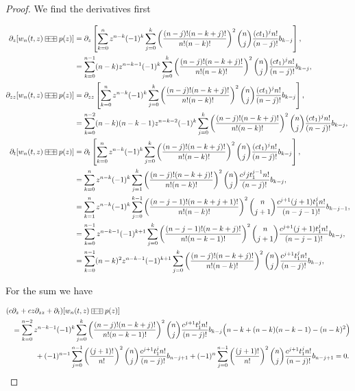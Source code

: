 \begin{proof}
    We find the derivatives first

    \begin{align*}
        \partial_z[w_n(t,z) \aac p(z)] &= \partial_z \left[ \sum_{k=0}^n z^{n-k}(-1)^k \sum_{j=0}^k \left(\frac{(n-j)!(n-k+j)!}{n!(n-k)!}\right)^2 \binom{n}{j}\frac{(ct_1)^jn!}{(n-j)!}b_{k-j}\right],\\ 
        &= \sum_{k=0}^{n-1} (n-k)z^{n-k-1}(-1)^k \sum_{j=0}^k \left(\frac{(n-j)!(n-k+j)!}{n!(n-k)!}\right)^2 \binom{n}{j}\frac{(ct_1)^jn!}{(n-j)!}b_{k-j},\\
        \partial_{zz}[w_n(t,z) \aac p(z)] &= \partial_{zz} \left[ \sum_{k=0}^n z^{n-k}(-1)^k \sum_{j=0}^k \left(\frac{(n-j)!(n-k+j)!}{n!(n-k)!}\right)^2 \binom{n}{j}\frac{(ct_1)^jn!}{(n-j)!}b_{k-j}\right],\\ 
        &= \sum_{k=0}^{n-2} (n-k)(n-k-1)z^{n-k-2}(-1)^k \sum_{j=0}^k \left(\frac{(n-j)!(n-k+j)!}{n!(n-k)!}\right)^2 \binom{n}{j}\frac{(ct_1)^jn!}{(n-j)!}b_{k-j},\\
        \partial_t[w_n(t,z) \aac p(z)] &= \partial_t \left[ \sum_{k=0}^n z^{n-k}(-1)^k \sum_{j=0}^k \left(\frac{(n-j)!(n-k+j)!}{n!(n-k)!}\right)^2 \binom{n}{j}\frac{(ct_1)^jn!}{(n-j)!}b_{k-j}\right],\\
        &= \sum_{k=0}^n z^{n-k}(-1)^k \sum_{j=1}^k \left(\frac{(n-j)!(n-k+j)!}{n!(n-k)!}\right)^2 \binom{n}{j}\frac{c^j jt_1^{j-1}n!}{(n-j)!}b_{k-j},\\ 
        &= \sum_{k=1}^n z^{n-k}(-1)^k \sum_{j=0}^{k-1} \left(\frac{(n-j-1)!(n-k+j+1)!}{n!(n-k)!}\right)^2 \binom{n}{j+1}\frac{c^{j+1} (j+1)t_1^{j}n!}{(n-j-1)!}b_{k-j-1},\\ 
        &= \sum_{k=0}^{n-1} z^{n-k-1}(-1)^{k+1} \sum_{j=0}^{k} \left(\frac{(n-j-1)!(n-k+j)!}{n!(n-k-1)!}\right)^2 \binom{n}{j+1}\frac{c^{j+1} (j+1)t_1^{j}n!}{(n-j-1)!}b_{k-j},\\ 
        &= \sum_{k=0}^{n-1} (n-k)^2 z^{n-k-1}(-1)^{k+1} \sum_{j=0}^{k} \left(\frac{(n-j)!(n-k+j)!}{n!(n-k)!}\right)^2 \binom{n}{j}\frac{c^{j+1}t_1^{j}n!}{(n-j)!}b_{k-j},\\ 
    \end{align*}

    For the sum we have

    \begin{align*}
        (c&\partial_z + cz\partial_{zz} + \partial_t )[w_n(t,z)\aac p(z)] \\  &= \sum_{k=0}^{n-2} z^{n-k-1}(-1)^k \sum_{j=0}^{k} \left(\frac{(n-j)!(n-k+j)!}{n!(n-k-1)!}\right)^2 \binom{n}{j}\frac{c^{j+1}t_1^{j}n!}{(n-j)!}b_{k-j}\Bigl(n-k + (n-k)(n-k-1) - (n-k)^2\Bigr)\\ 
        &\phantom{espacio}+ (-1)^{n-1}\sum_{j=0}^{n-1} \left( \frac{(j+1)!}{n!} \right)^2\binom{n}{j}\frac{c^{j+1}t_1^{j}n!}{(n-j)!}b_{n-j+1} + (-1)^{n}\sum_{j=0}^{n-1} \left( \frac{(j+1)!}{n!} \right)^2\binom{n}{j}\frac{c^{j+1}t_1^{j}n!}{(n-j)!}b_{n-j+1} = 0.
    \end{align*}
\end{proof}


